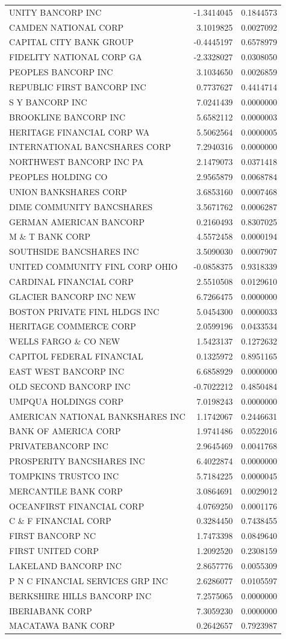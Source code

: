 \documentclass[11pt,]{article}
\begin{document}
\begin{longtable}[]{@{}lrr@{}}
UNITY BANCORP INC & -1.3414045 & 0.1844573\tabularnewline
CAMDEN NATIONAL CORP & 3.1019825 & 0.0027092\tabularnewline
CAPITAL CITY BANK GROUP & -0.4445197 & 0.6578979\tabularnewline
FIDELITY NATIONAL CORP GA & -2.3328027 & 0.0308050\tabularnewline
PEOPLES BANCORP INC & 3.1034650 & 0.0026859\tabularnewline
REPUBLIC FIRST BANCORP INC & 0.7737627 & 0.4414714\tabularnewline
S Y BANCORP INC & 7.0241439 & 0.0000000\tabularnewline
BROOKLINE BANCORP INC & 5.6582112 & 0.0000003\tabularnewline
HERITAGE FINANCIAL CORP WA & 5.5062564 & 0.0000005\tabularnewline
INTERNATIONAL BANCSHARES CORP & 7.2940316 & 0.0000000\tabularnewline
NORTHWEST BANCORP INC PA & 2.1479073 & 0.0371418\tabularnewline
PEOPLES HOLDING CO & 2.9565879 & 0.0068784\tabularnewline
UNION BANKSHARES CORP & 3.6853160 & 0.0007468\tabularnewline
DIME COMMUNITY BANCSHARES & 3.5671762 & 0.0006287\tabularnewline
GERMAN AMERICAN BANCORP & 0.2160493 & 0.8307025\tabularnewline
M \& T BANK CORP & 4.5572458 & 0.0000194\tabularnewline
SOUTHSIDE BANCSHARES INC & 3.5090030 & 0.0007907\tabularnewline
UNITED COMMUNITY FINL CORP OHIO & -0.0858375 & 0.9318339\tabularnewline
CARDINAL FINANCIAL CORP & 2.5510508 & 0.0129610\tabularnewline
GLACIER BANCORP INC NEW & 6.7266475 & 0.0000000\tabularnewline
BOSTON PRIVATE FINL HLDGS INC & 5.0454300 & 0.0000033\tabularnewline
HERITAGE COMMERCE CORP & 2.0599196 & 0.0433534\tabularnewline
WELLS FARGO \& CO NEW & 1.5423137 & 0.1272632\tabularnewline
CAPITOL FEDERAL FINANCIAL & 0.1325972 & 0.8951165\tabularnewline
EAST WEST BANCORP INC & 6.6858929 & 0.0000000\tabularnewline
OLD SECOND BANCORP INC & -0.7022212 & 0.4850484\tabularnewline
UMPQUA HOLDINGS CORP & 7.0198243 & 0.0000000\tabularnewline
AMERICAN NATIONAL BANKSHARES INC & 1.1742067 & 0.2446631\tabularnewline
BANK OF AMERICA CORP & 1.9741486 & 0.0522016\tabularnewline
PRIVATEBANCORP INC & 2.9645469 & 0.0041768\tabularnewline
PROSPERITY BANCSHARES INC & 6.4022874 & 0.0000000\tabularnewline
TOMPKINS TRUSTCO INC & 5.7184225 & 0.0000045\tabularnewline
MERCANTILE BANK CORP & 3.0864691 & 0.0029012\tabularnewline
OCEANFIRST FINANCIAL CORP & 4.0769250 & 0.0001176\tabularnewline
C \& F FINANCIAL CORP & 0.3284450 & 0.7438455\tabularnewline
FIRST BANCORP NC & 1.7473398 & 0.0849640\tabularnewline
FIRST UNITED CORP & 1.2092520 & 0.2308159\tabularnewline
LAKELAND BANCORP INC & 2.8657776 & 0.0055309\tabularnewline
P N C FINANCIAL SERVICES GRP INC & 2.6286077 & 0.0105597\tabularnewline
BERKSHIRE HILLS BANCORP INC & 7.2575065 & 0.0000000\tabularnewline
IBERIABANK CORP & 7.3059230 & 0.0000000\tabularnewline
MACATAWA BANK CORP & 0.2642657 & 0.7923987\tabularnewline

\end{longtable}
\end{document}
